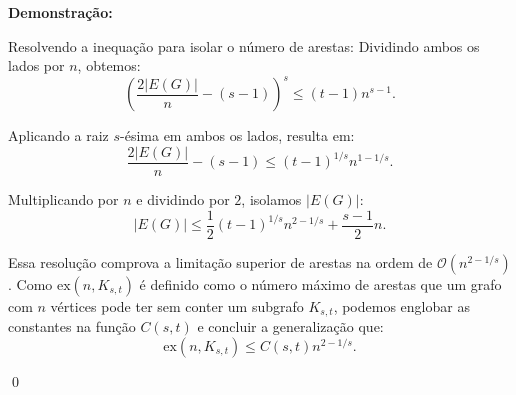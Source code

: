 \documentclass[12pt]{article}
\newenvironment{sol}
    {\textbf{Demonstração:}\emph{}
    }
    {
    \qed
    }
\begin{document}
\begin{sol}
    Resolvendo a inequação para isolar o número de arestas:
    Dividindo ambos os lados por $n$, obtemos:
    \[ 
        \left(\frac{2|E(G)|}{n} - (s-1)\right)^s \le (t-1)n^{s-1}. 
    \]

    Aplicando a raiz $s$-ésima em ambos os lados, resulta em:
    \[ 
        \frac{2|E(G)|}{n} - (s-1) \le (t-1)^{1/s} n^{1 - 1/s}. 
    \]

    Multiplicando por $n$ e dividindo por $2$, isolamos $|E(G)|$:
    \[ 
        |E(G)| \le \frac{1}{2} (t-1)^{1/s} n^{2 - 1/s} + \frac{s-1}{2} n. 
    \]

    Essa resolução comprova a limitação superior de arestas na ordem de $\mathcal{O}(n^{2 - 1/s})$.
    Como $\mathrm{ex}(n, K_{s,t})$ é definido como o número máximo de arestas que um grafo com $n$ vértices pode ter sem conter um subgrafo $K_{s,t}$, podemos englobar as constantes na função $C(s,t)$ e concluir a generalização que:   
    \[ 
        \mathrm{ex}(n, K_{s,t}) \le C(s,t) n^{2 - 1/s}. 
    \]
\end{sol}
\end{document}
